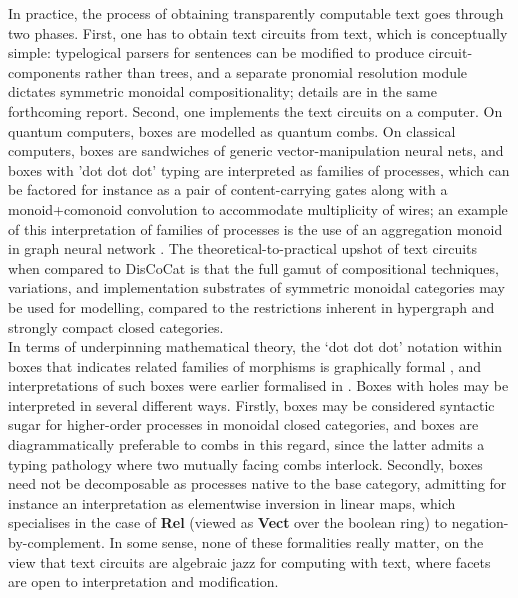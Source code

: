 In practice, the process of obtaining transparently computable text goes through two phases. First, one has to obtain text circuits from text, which is conceptually simple: typelogical parsers for sentences can be modified to produce circuit-components rather than trees, and a separate pronomial resolution module dictates symmetric monoidal compositionality; details are in the same forthcoming report. Second, one implements the text circuits on a computer. On quantum computers, boxes are modelled as quantum combs. On classical computers, boxes are sandwiches of generic vector-manipulation neural nets, and boxes with 'dot dot dot' typing are interpreted as families of processes, which can be factored for instance as a pair of content-carrying gates along with a monoid+comonoid convolution to accommodate multiplicity of wires; an example of this interpretation of families of processes is the use of an aggregation monoid in graph neural network \citep{dudzikGraphNeuralNetworks2022}. The theoretical-to-practical upshot of text circuits when compared to DisCoCat is that the full gamut of compositional techniques, variations, and implementation substrates of symmetric monoidal categories may be used for modelling, compared to the restrictions inherent in hypergraph and strongly compact closed categories.\\

In terms of underpinning mathematical theory, the `dot dot dot' notation within boxes that indicates related families of morphisms is graphically formal \citep{wilsonStringDiagramsNonstrict2022a}, and interpretations of such boxes were earlier formalised in \citep{merryReasoningGraphs2014a,quickdavidLogic2015,zamdzhievRewritingContextfreeFamilies2017a}. Boxes with holes may be interpreted in several different ways. Firstly, boxes may be considered syntactic sugar for higher-order processes in monoidal closed categories, and boxes are diagrammatically preferable to combs in this regard, since the latter admits a typing pathology where two mutually facing combs interlock. Secondly, boxes need not be decomposable as processes native to the base category, admitting for instance an interpretation as elementwise inversion in linear maps, which specialises in the case of \textbf{Rel} (viewed as \textbf{Vect} over the boolean ring) to negation-by-complement. In some sense, none of these formalities really matter, on the view that text circuits are algebraic jazz for computing with text, where facets are open to interpretation and modification.\\


